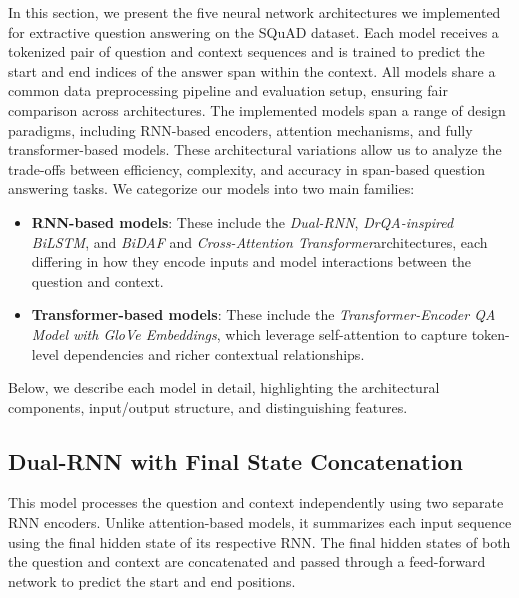 \documentclass[runningheads]{llncs}
\begin{document}
In this section, we present the five neural network architectures we implemented for extractive question answering on the SQuAD dataset. Each model receives a tokenized pair of question and context sequences and is trained to predict the start and end indices of the answer span within the context. All models share a common data preprocessing pipeline and evaluation setup, ensuring fair comparison across architectures. The implemented models span a range of design paradigms, including RNN-based encoders, attention mechanisms, and fully transformer-based models. These architectural variations allow us to analyze the trade-offs between efficiency, complexity, and accuracy in span-based question answering tasks. We categorize our models into two main families:
\begin{itemize}
    \item \textbf{RNN-based models}: These include the \textit{Dual-RNN}, \textit{DrQA-inspired BiLSTM}, and \textit{BiDAF} and \textit{Cross-Attention Transformer}architectures, each differing in how they encode inputs and model interactions between the question and context.
    \item \textbf{Transformer-based models}: These include  the \textit{Transformer-Encoder QA Model with GloVe Embeddings}, which leverage self-attention to capture token-level dependencies and richer contextual relationships.
\end{itemize}

Below, we describe each model in detail, highlighting the architectural components, input/output structure, and distinguishing features.


\subsection{Dual-RNN with Final State Concatenation}
This model processes the question and context independently using two separate RNN encoders. Unlike attention-based models, it summarizes each input sequence using the final hidden state of its respective RNN. The final hidden states of both the question and context are concatenated and passed through a feed-forward network to predict the start and end positions.
\end{document}
